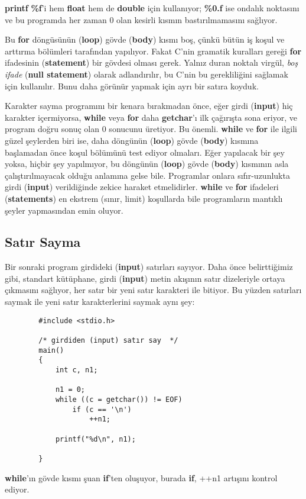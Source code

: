\documentclass[a4paper,12pt,oneside]{book}
\begin{document}
\textbf{printf} \textbf{\%f}'i hem \textbf{float} hem de \textbf{double} için kullanıyor; \textbf{\%0.f} ise ondalık noktasını ve bu programda her zaman 0 olan kesirli kısmın bastırılmamasını sağlıyor.
\par Bu \textbf{for} döngüsünün (\textbf{loop}) gövde (\textbf{body}) kısmı boş, çünkü bütün iş koşul ve arttırma bölümleri tarafından yapılıyor. Fakat C'nin gramatik kuralları gereği \textbf{for} ifadesinin (\textbf{statement}) bir gövdesi olması gerek. Yalnız duran noktalı virgül, \textit{boş ifade} (\textbf{null statement}) olarak adlandırılır, bu C'nin bu gerekliliğini sağlamak için kullanılır. Bunu daha görünür yapmak için ayrı bir satıra koyduk.
\par Karakter sayma programını bir kenara bırakmadan önce, eğer girdi (\textbf{input}) hiç karakter içermiyorsa, \textbf{while} veya \textbf{for} daha \textbf{getchar}'ı ilk çağırışta sona eriyor, ve program doğru sonuç olan 0 sonucunu üretiyor. Bu önemli. \textbf{while} ve \textbf{for} ile ilgili güzel şeylerden biri ise, daha döngünün (\textbf{loop}) gövde (\textbf{body}) kısmına başlamadan önce koşul bölümünü test ediyor olmaları. Eğer yapılacak bir şey yoksa, hiçbir şey yapılmıyor, bu döngünün (\textbf{loop}) gövde (\textbf{body}) kısmının asla çalıştırılmayacak olduğu anlamına gelse bile. Programlar onlara sıfır-uzunlukta girdi (\textbf{input}) verildiğinde zekice haraket etmelidirler. \textbf{while} ve \textbf{for} ifadeleri (\textbf{statements}) en ekstrem (sınır, limit) koşullarda bile programların mantıklı şeyler yapmasından emin oluyor.

\subsection{Satır Sayma}

Bir sonraki program girdideki (\textbf{input}) satırları sayıyor. Daha önce belirttiğimiz gibi, standart kütüphane, girdi (\textbf{input}) metin akışının satır dizeleriyle ortaya çıkmasını sağlıyor, her satır bir yeni satır karakteri ile bitiyor. Bu yüzden satırları saymak ile yeni satır karakterlerini saymak aynı şey:

\begin{lstlisting}
		#include <stdio.h>

		/* girdiden (input) satır say  */
		main()
		{
			int c, n1;

			n1 = 0;
			while ((c = getchar()) != EOF)
				if (c == '\n')
					++n1;

			printf("%d\n", n1);

		}
\end{lstlisting}

\textbf{while}'ın gövde kısmı şuan \textbf{if}'ten oluşuyor, burada \textbf{if}, ++n1 artışını kontrol ediyor.
\end{document}
